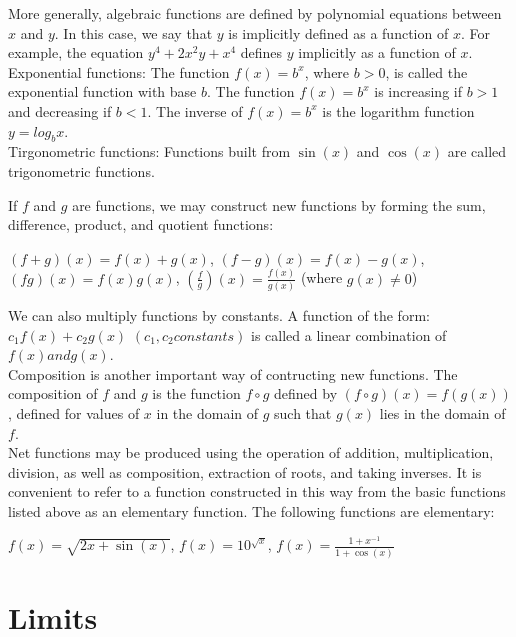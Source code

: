\documentclass{article}
\begin{document}
More generally, algebraic functions are defined by polynomial equations between $x$ and $y$. In this case, we say that $y$ is implicitly defined as a function of $x$. For example, the equation $y^4 + 2x^{2}y + x^4$ defines $y$ implicitly as a function of $x$.\\

Exponential functions: The function $f(x) = b^x$, where $b > 0$, is called the exponential function with base $b$. The function $f(x) = b^x$ is increasing if $b > 1$ and decreasing if $b < 1$. The inverse of $f(x) = b^x$ is the logarithm function $y = log_{b}x$.\\

Tirgonometric functions: Functions built from $\sin(x)$ and $\cos(x)$ are called trigonometric functions.

If $f$ and $g$ are functions, we may construct new functions by forming the sum, difference, product, and quotient functions:\\
\begin{center} $(f + g)(x) = f(x) + g(x)$, $(f - g)(x) = f(x) - g(x)$, $(fg)(x) = f(x)g(x)$, $(\frac{f}{g})(x) = \frac{f(x)}{g(x)}$ (where $g(x) \neq 0$)\end{center}

We can also multiply functions by constants. A function of the form: $c_1f(x) + c_2g(x)$ $(c_1, c_2 constants)$ is called a linear combination of $f(x) and g(x)$.\\

Composition is another important way of contructing new functions. The composition of $f$ and $g$ is the function $f \circ g$ defined by $(f \circ g)(x) = f(g(x))$, defined for values of $x$ in the domain of $g$ such that $g(x)$ lies in the domain of $f$.\\

Net functions may be produced using the operation of addition, multiplication, division, as well as composition, extraction of roots, and taking inverses. It is convenient to refer to a function constructed in this way from the basic functions listed above as an elementary function. The following functions are elementary:\\
\begin{center} $f(x) = \sqrt{2x + \sin(x)}$, $f(x) = 10^{\sqrt{x}}$, $f(x) = \frac{1 + x^{-1}}{1 + \cos(x)}$\end{center}

\section* {Limits}
\end{document}
